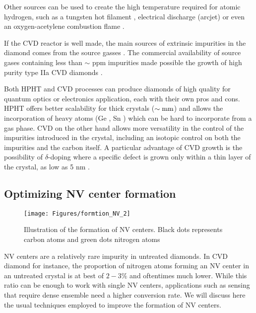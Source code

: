 \documentclass[a4paper,11pt]{report}
\begin{document}
Other sources can be used to create the high temperature required for atomic hydrogen, such as a tungsten hot filament \citep{haubner1993diamond}, electrical discharge (arcjet) \citep{luque1998excited} or even an oxygen-acetylene combustion flame \citep{bachmann1991towards}.

If the CVD reactor is well made, the main sources of extrinsic impurities in the diamond comes from the source gasses \citep{balmer2009chemical}. The commercial availability of source gases containing less than $\sim$ ppm impurities made possible the growth of  high purity type IIa CVD diamonds \citep{kasu2003high, twitchen2004high, tallaire2006characterisation}.

\medskip
Both HPHT and CVD processes can produce diamonds of high quality for quantum optics or electronics application, each with their own pros and cons. HPHT offers better scalability for thick crystals ($\sim \rm mm$) and allows the incorporation of heavy atoms (Ge \citep{palyanov2015germanium} , Sn \citep{ekimov2019effect}) which can be hard to incorporate from a gas phase. CVD on the other hand allows more versatility in the control of the impurities introduced in the crystal, including an isotopic control on both the impurities and the carbon itself. A particular advantage of CVD growth is the possibility of $\delta$-doping where a specific defect is grown only within a thin layer of the crystal, as low as 5 nm \citep{ohno2012engineering, ishikawa2012optical, ohashi2013negatively}.

\subsection{Optimizing NV center formation}
\begin{figure}[h!]
\centering
\texttt{[image: Figures/formtion\_NV\_2]}
\caption{Illustration of the formation of NV centers. Black dots represents carbon atoms and green dots nitrogen atoms}
\label{formation NV}
\end{figure}

NV centers are a relatively rare impurity in untreated diamonds. In CVD diamond for instance, the proportion of nitrogen atoms forming an NV center in an untreated crystal is at best of $2-3 \%$ \citep{hartland2014study} and oftentimes much lower. While this ratio can be enough  to work with single NV centers, applications such as sensing that require dense ensemble need a higher conversion rate. We will discuss here the usual techniques employed to improve the formation of NV centers.
\end{document}
